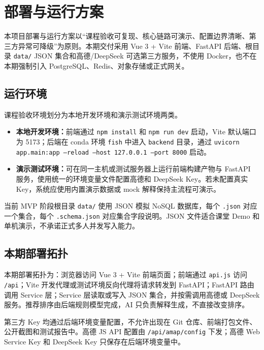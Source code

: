 \section{部署与运行方案}

本项目部署与运行方案以“课程验收可复现、核心链路可演示、配置边界清晰、第三方异常可降级”为原则。本期交付采用 Vue 3 + Vite 前端、FastAPI 后端、根目录 \texttt{data/} JSON 集合和高德/DeepSeek 可选第三方服务，不使用 Docker，也不在本期强制引入 PostgreSQL、Redis、对象存储或正式网关。

\subsection{运行环境}

课程验收环境划分为本地开发环境和演示测试环境两类。

\begin{itemize}
  \item \textbf{本地开发环境：}前端通过 \texttt{npm install} 和 \texttt{npm run dev} 启动，Vite 默认端口为 5173；后端在 conda 环境 \texttt{fish} 中进入 \texttt{backend} 目录，通过 \texttt{uvicorn app.main:app --reload --host 127.0.0.1 --port 8000} 启动。
  \item \textbf{演示测试环境：}可在同一主机或测试服务器上运行前端构建产物与 FastAPI 服务，使用统一的环境变量文件配置高德和 DeepSeek Key。若未配置真实 Key，系统应使用内置演示数据或 mock 解释保持主流程可演示。
\end{itemize}

当前 MVP 阶段根目录 \texttt{data/} 使用 JSON 模拟 NoSQL 数据库，每个 \texttt{.json} 对应一个集合，每个 \texttt{.schema.json} 对应集合字段说明。JSON 文件适合课堂 Demo 和单机演示，不承诺正式多人并发写入能力。

\subsection{本期部署拓扑}

本期部署拓扑为：浏览器访问 Vue 3 + Vite 前端页面；前端通过 \texttt{api.js} 访问 \texttt{/api}；Vite 开发代理或测试环境反向代理将请求转发到 FastAPI；FastAPI 路由调用 Service 层；Service 层读取或写入 JSON 集合，并按需调用高德或 DeepSeek 服务。推荐排序由后端规则模型完成，AI 只负责解释生成，不直接改变排序。

第三方 Key 均通过后端环境变量配置，不允许出现在 Git 仓库、前端打包文件、公开截图和测试报告中。高德 JS API 配置由 \texttt{/api/amap/config} 下发；高德 Web Service Key 和 DeepSeek Key 只保存在后端环境变量中。

